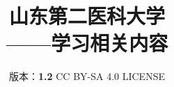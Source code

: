 

\title{%
    \normalsize
    \vspace{120pt}
    {\Huge\textbf{山东第二医科大学\\[5pt]——学习相关内容}}
}
\author{%
    版本：\textbf{1.2} \qquad%
    CC BY-SA 4.0 LICENSE \qquad%
    }
\date{\CurrentCustomTime}
\maketitle

\renewcommand{\thefootnote}{\arabic{footnote}}

\vspace{15ex}
